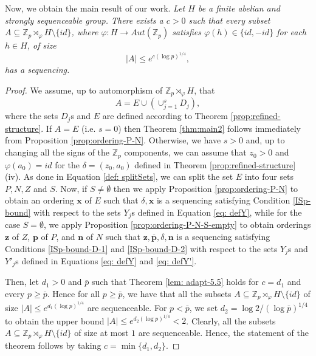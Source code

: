 \documentclass[11pt]{amsart}
\theoremstyle{definition}
\newcommand{\bp}{\mathbf{p}}
\newcommand{\bn}{\mathbf{n}}
\newenvironment{mythm}[1]
  {\renewcommand\theinnercustomthm{#1}\innercustomthm}
  {\endinnercustomthm}
\begin{document}
Now, we obtain the main result of our work.
\begin{mythm}{\ref{thm:main2}}
\emph{Let $H$ be a finite abelian and strongly sequenceable group. There exists a $c > 0$ such that every subset $A \subseteq \mathbb{Z}_p \rtimes_{\varphi} H \setminus \{id\}$, where $\varphi: H \to Aut(\mathbb{Z}_p)$ satisfies $\varphi(h) \in \{id, -id\}$ for each $h \in H$, of size
$$ |A| \leq e^{c(\log p)^{1/4}},$$
has a sequencing.}
\end{mythm}

\begin{proof}
    We assume, up to automorphism of $\mathbb{Z}_{p} \rtimes_{\varphi} H$, that $$A = E \cup(\cup_{j=1}^{s} D_j),$$ where the sets $D_j$s and $E$ are defined according to Theorem \ref{prop:refined-structure}. If $A=E$ (i.e. $s=0$) then Theorem \ref{thm:main2} follows immediately from Proposition \ref{prop:ordering-P-N}. Otherwise, we have $s>0$ and, up to changing all the signs of the $\mathbb{Z}_p$ components, we can assume that $z_0> 0$ and $\varphi(a_0) = id$ for the $\delta=(z_0,a_0)$ defined in Theorem \ref{prop:refined-structure}(iv). As done in Equation \eqref{def: splitSets}, we can split the set $E$ into four sets $P, N, Z$ and $S$. Now, if $S \neq \emptyset$ then we apply Proposition \ref{prop:ordering-P-N} to obtain an ordering $\mathbf{x}$ of $E$ such that $\delta, \mathbf{x}$ is a sequencing satisfying Condition \eqref{ISp-bound} with respect to the sets $Y_j$s defined in Equation \eqref{eq: defY}, while for the case $S = \emptyset$, we apply Proposition \ref{prop:ordering-P-N-S-empty} to obtain orderings $\mathbf{z}$ of $Z$, $\bp$ of $P$, and $\bn$ of $N$ such that $\mathbf{z}, \overline{\bp}, \delta, \bn$ is a sequencing satisfying Conditions \eqref{ISp-bound-D-1} and \eqref{ISp-bound-D-2} with respect to the sets $Y_j$s and $Y'_j$s defined in Equations \eqref{eq: defY} and \eqref{eq: defY'}.
    
    Then, let $d_1 > 0$ and $\bar{p}$ such that Theorem \ref{lem: adapt-5.5} holds for $c = d_1$ and every $p \geq \bar{p}$. Hence for all $p \geq \bar{p}$, we have that all the subsets $A \subseteq \mathbb{Z}_p \rtimes_{\varphi} H \setminus \{id\}$ of size $|A| \leq e^{d_1 (\log p)^{1/4}}$ are sequenceable. For $p < \bar{p}$, we set $d_2 = \log 2 / (\log \bar{p})^{1/4}$ to obtain the upper bound $|A| \leq e^{d_2 (\log p)^{1/4}} < 2$. Clearly, all the subsets $A \subseteq \mathbb{Z}_p \rtimes_{\varphi} H \setminus \{id\}$ of size at most $1$ are sequenceable. Hence, the statement of the theorem follows by taking $c = \min\{d_1, d_2\}$.
\end{proof}
\end{document}

